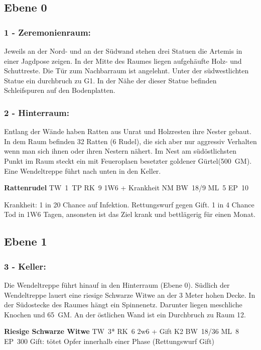 \subsection{Ebene 0}

\subsubsection{1 - Zeremonienraum:} Jeweils an der Nord- und an der Südwand stehen drei
Statuen die Artemis in einer Jagdpose zeigen. In der Mitte des Raumes
liegen aufgehäufte Holz- und Schuttreste. Die Tür zum Nachbarraum ist
angelehnt. Unter der südwestlichten Statue ein durchbruch zu G1. In
der Nähe der dieser Statue befinden Schleifspuren auf den Bodenplatten.

\subsubsection{2 - Hinterraum:} Entlang der Wände haben Ratten aus Unrat und Holzresten
ihre Nester gebaut. In dem Raum befinden 32 Ratten (6 Rudel), die sich
aber nur aggressiv Verhalten wenn man sich ihnen oder ihren Nestern
nähert. Im Nest am südöstlichsten Punkt im Raum steckt ein mit
Feueroplaen besetzter goldener Gürtel(500~GM). Eine Wendeltreppe führt
nach unten in den Keller.  

\textbf{Rattenrudel} TW~1~TP RK~9 1W6 + Krankheit NM
BW~18/9 ML~5 EP~10 

Krankheit: 1 in 20 Chance auf Infektion. Rettungswurf
gegen Gift. 1 in 4 Chance Tod in 1W6 Tagen, ansonsten ist das Ziel krank
und bettlägerig für einen Monat.

\subsection{Ebene 1}

\subsubsection{3 - Keller:} Die Wendeltreppe führt hinauf in den Hinterraum (Ebene
0). Südlich der Wendeltreppe lauert eine riesige Schwarze Witwe an
der 3 Meter hohen Decke.  In der Südostecke des Raumes hängt ein
Spinnenetz. Darunter liegen meschliche Knochen und 65~GM. An der östlichen
Wand ist ein Durchbruch zu Raum 12.  

\textbf{Riesige Schwarze Witwe} TW~3* RK~6 2w6 + Gift K2 BW~18/36 ML~8 EP~300 
Gift: tötet Opfer innerhalb einer Phase (Rettungswurf Gift)

